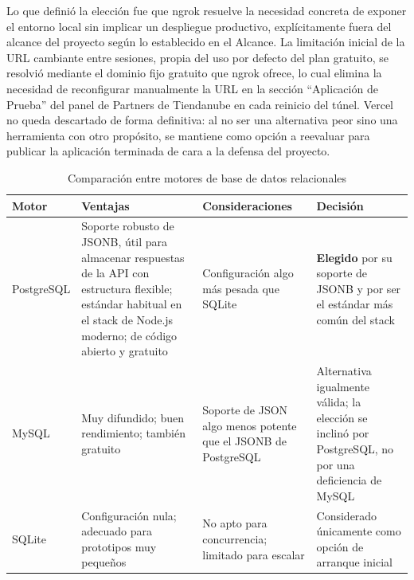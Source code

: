 Lo que definió la elección fue que ngrok resuelve la necesidad concreta de exponer el entorno local sin implicar un despliegue productivo, explícitamente fuera del alcance del proyecto según lo establecido en el Alcance. La limitación inicial de la URL cambiante entre sesiones, propia del uso por defecto del plan gratuito, se resolvió mediante el dominio fijo gratuito que ngrok ofrece, lo cual elimina la necesidad de reconfigurar manualmente la URL en la sección ``Aplicación de Prueba'' del panel de Partners de Tiendanube en cada reinicio del túnel. Vercel no queda descartado de forma definitiva: al no ser una alternativa peor sino una herramienta con otro propósito, se mantiene como opción a reevaluar para publicar la aplicación terminada de cara a la defensa del proyecto.

\begin{table}[h]
\centering
\caption{Comparación entre motores de base de datos relacionales}
\label{tab:comparativo_db_motor}
\renewcommand{\arraystretch}{1.3}
\begin{tabular}{|m{2.3cm}|m{4.4cm}|m{4.4cm}|m{3.4cm}|}
\hline
\textbf{Motor} & \textbf{Ventajas} & \textbf{Consideraciones} & \textbf{Decisión} \\
\hline
PostgreSQL & Soporte robusto de JSONB, útil para almacenar respuestas de la API con estructura flexible; estándar habitual en el stack de Node.js moderno; de código abierto y gratuito & Configuración algo más pesada que SQLite & \textbf{Elegido} por su soporte de JSONB y por ser el estándar más común del stack \\
\hline
MySQL & Muy difundido; buen rendimiento; también gratuito & Soporte de JSON algo menos potente que el JSONB de PostgreSQL & Alternativa igualmente válida; la elección se inclinó por PostgreSQL, no por una deficiencia de MySQL \\
\hline
SQLite & Configuración nula; adecuado para prototipos muy pequeños & No apto para concurrencia; limitado para escalar & Considerado únicamente como opción de arranque inicial \\
\hline
\end{tabular}
\end{table}

